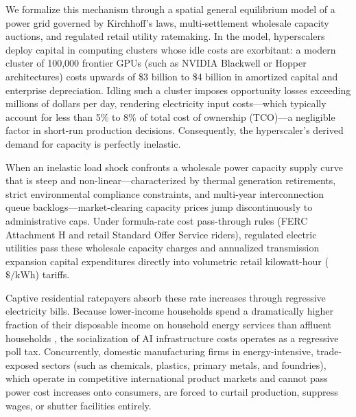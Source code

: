 \documentclass[11pt,a4paper]{article}
\begin{document}
We formalize this mechanism through a spatial general equilibrium model of a power grid governed by Kirchhoff's laws, multi-settlement wholesale capacity auctions, and regulated retail utility ratemaking. In the model, hyperscalers deploy capital in computing clusters whose idle costs are exorbitant: a modern cluster of 100,000 frontier GPUs (such as NVIDIA Blackwell or Hopper architectures) costs upwards of \$3 billion to \$4 billion in amortized capital and enterprise depreciation. Idling such a cluster imposes opportunity losses exceeding millions of dollars per day, rendering electricity input costs---which typically account for less than 5\% to 8\% of total cost of ownership (TCO)---a negligible factor in short-run production decisions. Consequently, the hyperscaler's derived demand for capacity is perfectly inelastic.

When an inelastic load shock confronts a wholesale power capacity supply curve that is steep and non-linear---characterized by thermal generation retirements, strict environmental compliance constraints, and multi-year interconnection queue backlogs---market-clearing capacity prices jump discontinuously to administrative caps. Under formula-rate cost pass-through rules (FERC Attachment H and retail Standard Offer Service riders), regulated electric utilities pass these wholesale capacity charges and annualized transmission expansion capital expenditures directly into volumetric retail kilowatt-hour ($\$/\text{kWh}$) tariffs.

Captive residential ratepayers absorb these rate increases through regressive electricity bills. Because lower-income households spend a dramatically higher fraction of their disposable income on household energy services than affluent households \citep{borenstein2022electricity, borenstein2025distributional}, the socialization of AI infrastructure costs operates as a regressive poll tax. Concurrently, domestic manufacturing firms in energy-intensive, trade-exposed sectors (such as chemicals, plastics, primary metals, and foundries), which operate in competitive international product markets and cannot pass power cost increases onto consumers, are forced to curtail production, suppress wages, or shutter facilities entirely.
\end{document}
